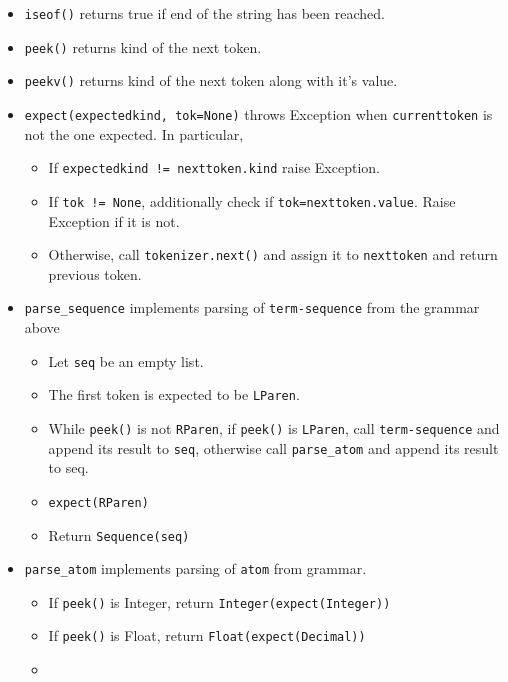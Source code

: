 \begin{itemize}
\item
\texttt{iseof()} returns true if end of the string has been reached.

\item
\texttt{peek()} returns kind of the next token. 

\item
\texttt{peekv()} returns kind of the next token along with it's value.

\item 
\texttt{expect(expectedkind, tok=None)} throws Exception when \texttt{currenttoken} is not the one expected. In particular,
	\begin{itemize}
		\item
		If \texttt{expectedkind != nexttoken.kind} raise Exception.
		\item
		If \texttt{tok != None}, additionally check if \texttt{tok=nexttoken.value}. Raise Exception if it is not.
		\item
		Otherwise, call \texttt{tokenizer.next()} and assign it to \texttt{nexttoken} and return previous token. 
	\end{itemize}

\item 
	\texttt{parse\_sequence} implements parsing of \texttt{term-sequence} from the grammar above
	\begin{itemize}
		\item
		Let \texttt{seq} be an empty list.

		\item
		The first token is expected to be \texttt{LParen}.

		\item
		While \texttt{peek()} is not \texttt{RParen}, if \texttt{peek()} is \texttt{LParen}, call \texttt{term-sequence} and append its result to \texttt{seq}, otherwise call \texttt{parse\_atom} and append its result to seq.
	
		\item
		\texttt{expect(RParen)} 

		\item
		Return \texttt{Sequence(seq)}
	\end{itemize}

\item
\texttt{parse\_atom} implements parsing of \texttt{atom} from grammar.
	\begin{itemize}
	\item
		If \texttt{peek()} is Integer, return \texttt{Integer(expect(Integer))}
	\item
		If \texttt{peek()} is Float, return \texttt{Float(expect(Decimal))}
	\item


\end{itemize}
\end{itemize}

